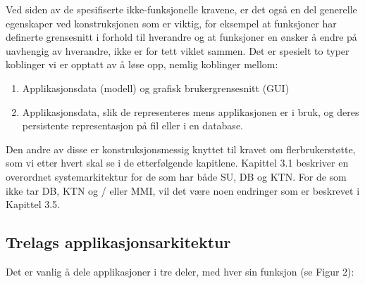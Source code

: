 \documentclass[a4paper]{scrartcl}
\begin{document}
Ved siden av de spesifiserte ikke-funksjonelle kravene, er det også en del generelle egenskaper ved konstruksjonen som er viktig, for eksempel at funksjoner har definerte grensesnitt i forhold til hverandre og at funksjoner en ønsker å endre på uavhengig av hverandre, ikke er for tett viklet sammen. Det er spesielt to typer koblinger vi er opptatt av å løse opp, nemlig koblinger mellom:

\begin{enumerate}

\item
Applikasjonsdata (modell) og grafisk brukergrensesnitt (GUI)

\item
Applikasjonsdata, slik de representeres mens applikasjonen er i bruk, og deres persistente representasjon på fil eller i en database. 

\end{enumerate}

Den andre av disse er konstruksjonsmessig knyttet til kravet om flerbrukerstøtte, som vi etter hvert skal se i de etterfølgende kapitlene. Kapittel 3.1 beskriver en overordnet systemarkitektur for de som har både SU, DB og KTN. For de som ikke tar DB, KTN og / eller MMI, vil det være noen endringer som er beskrevet i Kapittel 3.5.

\subsection{Trelags applikasjonsarkitektur}

Det er vanlig å dele applikasjoner i tre deler, med hver sin funksjon (se Figur 2):
\end{document}
